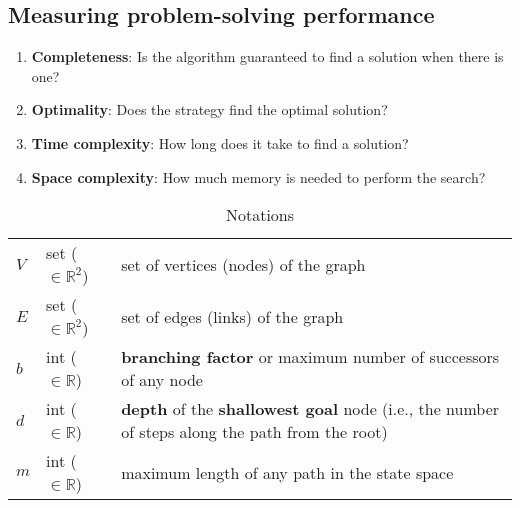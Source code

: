 \subsection{Measuring problem-solving performance}

\begin{enumerate}[itemsep=0.2cm]
    \item \textbf{Completeness}: Is the algorithm guaranteed to find a solution when there is one?
    \hfill \cite{ai/book/Artificial-Intelligence-A-Modern-Approach/Russell-Norvig}

    \item \textbf{Optimality}: Does the strategy find the optimal solution?
    \hfill \cite{ai/book/Artificial-Intelligence-A-Modern-Approach/Russell-Norvig}

    \item \textbf{Time complexity}: How long does it take to find a solution?
    \hfill \cite{ai/book/Artificial-Intelligence-A-Modern-Approach/Russell-Norvig}

    \item \textbf{Space complexity}: How much memory is needed to perform the search?
    \hfill \cite{ai/book/Artificial-Intelligence-A-Modern-Approach/Russell-Norvig}
\end{enumerate}


\vspace{0.5cm}

\begin{customArrayStretch}{1.3}
\begin{table}[H]
\centering
\begin{tabular}{l l p{12cm}}

$V$ & set ($\in \mathbb{R}^2$) & set of vertices (nodes) of the graph \\

$E$ & set ($\in \mathbb{R}^2$) & set of edges (links) of the graph \\

$b$ & int ($\in \mathbb{R}$) & \textbf{branching factor} or maximum number of successors of any node \\

$d$ & int ($\in \mathbb{R}$) & \textbf{depth} of the \textbf{shallowest goal} node (i.e., the number of steps along the path from the root) \\

$m$ & int ($\in \mathbb{R}$) & maximum length of any path in the state space \\

\end{tabular}
\caption*{Notations}
\end{table}
\end{customArrayStretch}



